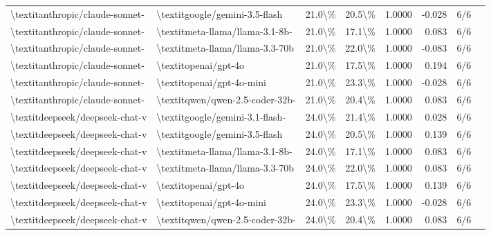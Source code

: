 \begin{table}[htbp]
{\begin{tabular}{ll|rrrrrl}
\textbackslash{}textit{anthropic/claude-sonnet-} & \textbackslash{}textit{google/gemini-3.5-flash} & 21.0\textbackslash{}\% & 20.5\textbackslash{}\% & 1.0000 & -0.028 & 6/6 \\
\textbackslash{}textit{anthropic/claude-sonnet-} & \textbackslash{}textit{meta-llama/llama-3.1-8b-} & 21.0\textbackslash{}\% & 17.1\textbackslash{}\% & 1.0000 & 0.083 & 6/6 \\
\textbackslash{}textit{anthropic/claude-sonnet-} & \textbackslash{}textit{meta-llama/llama-3.3-70b} & 21.0\textbackslash{}\% & 22.0\textbackslash{}\% & 1.0000 & -0.083 & 6/6 \\
\textbackslash{}textit{anthropic/claude-sonnet-} & \textbackslash{}textit{openai/gpt-4o} & 21.0\textbackslash{}\% & 17.5\textbackslash{}\% & 1.0000 & 0.194 & 6/6 \\
\textbackslash{}textit{anthropic/claude-sonnet-} & \textbackslash{}textit{openai/gpt-4o-mini} & 21.0\textbackslash{}\% & 23.3\textbackslash{}\% & 1.0000 & -0.028 & 6/6 \\
\textbackslash{}textit{anthropic/claude-sonnet-} & \textbackslash{}textit{qwen/qwen-2.5-coder-32b-} & 21.0\textbackslash{}\% & 20.4\textbackslash{}\% & 1.0000 & 0.083 & 6/6 \\
\textbackslash{}textit{deepseek/deepseek-chat-v} & \textbackslash{}textit{google/gemini-3.1-flash-} & 24.0\textbackslash{}\% & 21.4\textbackslash{}\% & 1.0000 & 0.028 & 6/6 \\
\textbackslash{}textit{deepseek/deepseek-chat-v} & \textbackslash{}textit{google/gemini-3.5-flash} & 24.0\textbackslash{}\% & 20.5\textbackslash{}\% & 1.0000 & 0.139 & 6/6 \\
\textbackslash{}textit{deepseek/deepseek-chat-v} & \textbackslash{}textit{meta-llama/llama-3.1-8b-} & 24.0\textbackslash{}\% & 17.1\textbackslash{}\% & 1.0000 & 0.083 & 6/6 \\
\textbackslash{}textit{deepseek/deepseek-chat-v} & \textbackslash{}textit{meta-llama/llama-3.3-70b} & 24.0\textbackslash{}\% & 22.0\textbackslash{}\% & 1.0000 & 0.083 & 6/6 \\
\textbackslash{}textit{deepseek/deepseek-chat-v} & \textbackslash{}textit{openai/gpt-4o} & 24.0\textbackslash{}\% & 17.5\textbackslash{}\% & 1.0000 & 0.139 & 6/6 \\
\textbackslash{}textit{deepseek/deepseek-chat-v} & \textbackslash{}textit{openai/gpt-4o-mini} & 24.0\textbackslash{}\% & 23.3\textbackslash{}\% & 1.0000 & -0.028 & 6/6 \\
\textbackslash{}textit{deepseek/deepseek-chat-v} & \textbackslash{}textit{qwen/qwen-2.5-coder-32b-} & 24.0\textbackslash{}\% & 20.4\textbackslash{}\% & 1.0000 & 0.083 & 6/6 \\

\end{tabular}}
\end{table}
